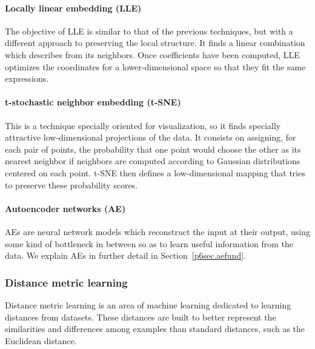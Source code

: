 \paragraph*{Locally linear embedding (LLE) } The objective of LLE is similar to that of the previous techniques, but with a different approach to preserving the local structure. It finds a linear combination which describes  from its neighbors. Once  coefficients have been computed, LLE optimizes the coordinates for a lower-dimensional space so that they fit the same expressions.

\paragraph*{t-stochastic neighbor embedding (t-SNE) } This is a technique specially oriented for visualization, so it finds specially attractive low-dimensional projections of the data. %
It consists on assigning, for each pair of points, the probability that one point would choose the other as its nearest neighbor if neighbors are computed according to Gaussian distributions centered on each point. t-SNE then defines a low-dimensional mapping that tries to preserve these probability scores.

\paragraph*{Autoencoder networks (AE) } AEs are neural network models which reconstruct the input at their output, using some kind of bottleneck in between so as to learn useful information from the data. We explain AEs in further detail in Section~\ref{p6sec.aefund}.


\subsubsection{Distance metric learning}

Distance metric learning  is an area of machine learning dedicated to learning distances from datasets. These distances are built to better represent the similarities and differences among examples than standard distances, such as the Euclidean distance.


